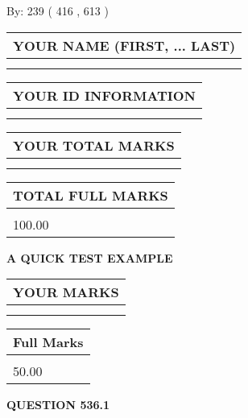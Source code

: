 \documentclass[12pt]{article}
\begin{document}
   
\hspace{1.0in} By: 
 239 ( 416 ,  613 )
   
   
   
   
\newpage 
\setcounter{page}{ 
   536001 } 
   
   
   
   
\noindent\begin{tabular}{|l|}
\hline
YOUR NAME (FIRST, ... LAST)  \\
\hline
 \\ 
 \\ 
\hline
\end{tabular}
\hspace{0.05in} \begin{tabular}{|l|}
\hline
 YOUR   ID   INFORMATION  \\
\hline
 \\ 
 \\ 
\hline
\end{tabular}
   
   
\vspace{0.2in}\noindent\begin{tabular}{|l|}
\hline
YOUR TOTAL MARKS  \\
\hline
 \\ 
 \\ 
\hline
\end{tabular}
\hspace{0.05in} \begin{tabular}{|l|}
\hline
TOTAL FULL MARKS  \\
\hline
 \\ 
100.00 \\
\hline
\end{tabular}
   
   
 \vspace{0.2in}
{\LARGE {\textbf{ A QUICK TEST EXAMPLE}}}
   
   
  
\vspace{0.2in}
  
\noindent\begin{tabular}{|l|}
\hline
 YOUR MARKS  \\
\hline
 \\ 
 \\ 
\hline
\end{tabular}
\hspace{0.05in} \begin{tabular}{|l|}
\hline
 Full Marks  \\
\hline
 \\ 
50.00 \\
\hline
\end{tabular}
{\textbf{\Large{QUESTION
536.1 
}}}
  
\end{document}
